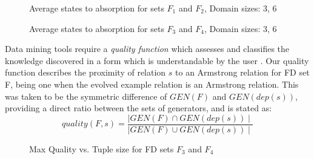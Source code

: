 \begin{figure}
\centerline{}
\caption{\label{graph:16_82}\scriptsize{Average states to absorption for sets $F_1$ and $F_2$, Domain sizes: 3, 6 }}
\end{figure}


\begin{figure}
\centerline{}
\caption{\label{graph:56_34}\scriptsize{Average states to absorption for sets $F_3$ and $F_4$, Domain sizes: 3, 6 }}
\end{figure}
 

Data mining tools require a {\em quality function} which assesses
and classifies the knowledge discovered in a form which is understandable
by the user \cite{hs94}. Our quality function describes the proximity of
relation $s$ to an Armstrong relation for FD set F, being one when the evolved 
example relation is an Armstrong relation. This was taken to be the
 symmetric difference of $GEN(F)$ and $GEN(dep(s))$, providing a direct ratio
 between the sets of generators, and is stated as:
\begin{displaymath}
quality(F, s) = \frac{\mid GEN(F) \cap GEN(dep(s)) \mid}{\mid GEN(F) \cup GEN(dep(s))\mid }
\end{displaymath}

\smallskip

\begin{figure}
\centerline{}
\caption{\label{graph:28_56}\scriptsize{Max Quality vs. Tuple size for FD sets  $F_3$ and $F_4$ }}
\end{figure}

